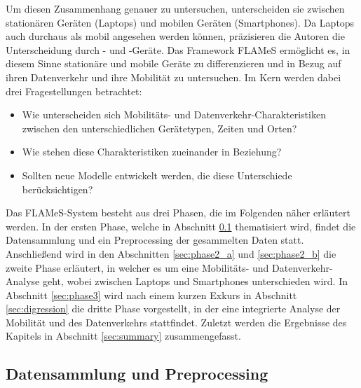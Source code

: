 \documentclass[12pt, a4paper]{article}
\begin{document}
Um diesen Zusammenhang genauer zu untersuchen, unterscheiden sie zwischen stationären Geräten (Laptops) und mobilen Geräten
(Smartphones). Da Laptops auch durchaus als mobil angesehen werden können, präzisieren die Autoren die Unterscheidung
durch - und -Geräte. Das Framework FLAMeS ermöglicht es, 
in diesem Sinne stationäre und mobile Geräte zu differenzieren und in Bezug auf ihren Datenverkehr und ihre 
Mobilität zu untersuchen. Im Kern werden dabei drei Fragestellungen betrachtet:
\begin{itemize}
    \item Wie unterscheiden sich Mobilitäts- und Datenverkehr-Charakteristiken zwischen den unterschiedlichen Gerätetypen,
    Zeiten und Orten?
    \item Wie stehen diese Charakteristiken zueinander in Beziehung?
    \item Sollten neue Modelle entwickelt werden, die diese Unterschiede berücksichtigen?
\end{itemize}
Das FLAMeS-System besteht aus drei Phasen, die im Folgenden näher erläutert werden. In der ersten Phase, welche in Abschnitt
\ref{sec:phase1} thematisiert wird, findet die Datensammlung und ein Preprocessing der gesammelten Daten statt.
Anschließend wird in den Abschnitten \ref{sec:phase2_a} und \ref{sec:phase2_b} die zweite Phase erläutert, 
in welcher es um eine Mobilitäts- und Datenverkehr-Analyse geht, wobei zwischen Laptops und Smartphones unterschieden wird. 
In Abschnitt \ref{sec:phase3} wird nach einem kurzen Exkurs in Abschnitt \ref{sec:digression} die dritte Phase vorgestellt, 
in der eine integrierte Analyse der Mobilität und des Datenverkehrs stattfindet. 
Zuletzt werden die Ergebnisse des Kapitels in Abschnitt \ref{sec:summary} zusammengefasst.


\subsection{Datensammlung und Preprocessing}
\label{sec:phase1}
\end{document}
